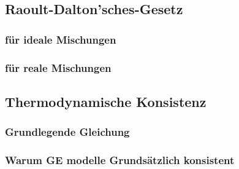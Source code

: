 \subsection{Raoult-Dalton'sches-Gesetz}
\subsubsection*{für ideale Mischungen}
\subsubsection*{für reale Mischungen}

\subsection{Thermodynamische Konsistenz}
\subsubsection*{Grundlegende Gleichung}
\subsubsection*{Warum GE modelle Grundsätzlich konsistent}
